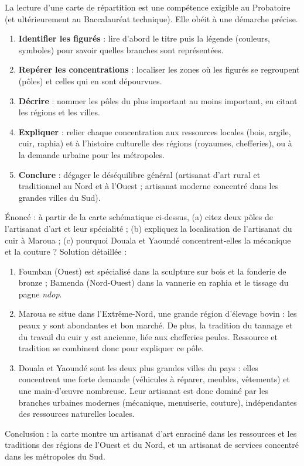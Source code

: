 \documentclass[11pt]{article}
\begin{document}
La lecture d'une carte de répartition est une compétence exigible au Probatoire (et ultérieurement au Baccalauréat technique). Elle obéit à une démarche précise.

\begin{methode}
\begin{enumerate}
\item \textbf{Identifier les figurés} : lire d'abord le titre puis la légende (couleurs, symboles) pour savoir quelles branches sont représentées.
\item \textbf{Repérer les concentrations} : localiser les zones où les figurés se regroupent (pôles) et celles qui en sont dépourvues.
\item \textbf{Décrire} : nommer les pôles du plus important au moins important, en citant les régions et les villes.
\item \textbf{Expliquer} : relier chaque concentration aux ressources locales (bois, argile, cuir, raphia) et à l'histoire culturelle des régions (royaumes, chefferies), ou à la demande urbaine pour les métropoles.
\item \textbf{Conclure} : dégager le déséquilibre général (artisanat d'art rural et traditionnel au Nord et à l'Ouest ; artisanat moderne concentré dans les grandes villes du Sud).
\end{enumerate}
\end{methode}

\begin{exoresolu}
Énoncé : à partir de la carte schématique ci-dessus, (a) citez deux pôles de l'artisanat d'art et leur spécialité ; (b) expliquez la localisation de l'artisanat du cuir à Maroua ; (c) pourquoi Douala et Yaoundé concentrent-elles la mécanique et la couture ?
\tcblower
Solution détaillée :
\begin{enumerate}
\item[(a)] Foumban (Ouest) est spécialisé dans la sculpture sur bois et la fonderie de bronze ; Bamenda (Nord-Ouest) dans la vannerie en raphia et le tissage du pagne \emph{ndop}.
\item[(b)] Maroua se situe dans l'Extrême-Nord, une grande région d'élevage bovin : les peaux y sont abondantes et bon marché. De plus, la tradition du tannage et du travail du cuir y est ancienne, liée aux chefferies peules. Ressource et tradition se combinent donc pour expliquer ce pôle.
\item[(c)] Douala et Yaoundé sont les deux plus grandes villes du pays : elles concentrent une forte demande (véhicules à réparer, meubles, vêtements) et une main-d'œuvre nombreuse. Leur artisanat est donc dominé par les branches urbaines modernes (mécanique, menuiserie, couture), indépendantes des ressources naturelles locales.
\end{enumerate}
Conclusion : la carte montre un artisanat d'art enraciné dans les ressources et les traditions des régions de l'Ouest et du Nord, et un artisanat de services concentré dans les métropoles du Sud.
\end{exoresolu}
\end{document}
